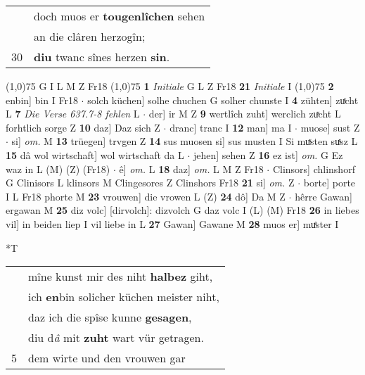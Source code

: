 \documentclass[8pt,a4paper,notitlepage]{article}
\begin{document}
\begin{table}[ht]
\begin{minipage}[t]{0.5\linewidth}
\begin{tabular}{rl}
 & doch muos er \textbf{tougenlîchen} sehen\\ 
 & an die clâren herzogîn;\\ 
30 & \textbf{diu} twanc sînes herzen \textbf{sin}.\\ 
\end{tabular}
\scriptsize
\line(1,0){75} \newline
G I L M Z Fr18 \newline
\line(1,0){75} \newline
\textbf{1} \textit{Initiale} G L Z Fr18  \textbf{21} \textit{Initiale} I  \newline
\line(1,0){75} \newline
\textbf{2} enbin] bin I Fr18  $\cdot$ solch küchen] solhe chuchen G solher chunste I \textbf{4} zühten] zuͯcht L \textbf{7} \textit{Die Verse 637.7-8 fehlen} L   $\cdot$ der] ir M Z \textbf{9} wertlîch zuht] werclich zuͯcht L forhtlich sorge Z \textbf{10} daz] Daz sich Z  $\cdot$ dranc] tranc I \textbf{12} man] ma I  $\cdot$ muose] sust Z  $\cdot$ si] \textit{om.} M \textbf{13} trüegen] trvgen Z \textbf{14} sus muosen si] sus musten I Si muͯsten suͯsz L \textbf{15} dâ wol wirtschaft] wol wirtschaft da L  $\cdot$ jehen] sehen Z \textbf{16} ez ist] \textit{om.} G Ez waz in L (M) (Z) (Fr18)  $\cdot$ ê] \textit{om.} L \textbf{18} daz] \textit{om.} L M Z Fr18  $\cdot$ Clinsors] chlinshorf G Clinisors L klinsors M Clingesores Z Clinshors Fr18 \textbf{21} si] \textit{om.} Z  $\cdot$ borte] porte I L Fr18 phorte M \textbf{23} vrouwen] die vrowen L (Z) \textbf{24} dô] Da M Z  $\cdot$ hêrre Gawan] ergawan M \textbf{25} diz volc] [dirvolch]: dizvolch G daz volc I (L) (M) Fr18 \textbf{26} in liebes vil] in beiden liep I vil liebe in L \textbf{27} Gawan] Gawane M \textbf{28} muos er] muͤster I \newline
\end{minipage}
\hspace{0.5cm}
\begin{minipage}[t]{0.5\linewidth}
\small
\begin{center}*T
\end{center}
\begin{tabular}{rl}
 & mîne kunst mir des niht \textbf{halbez} giht,\\ 
 & ich \textbf{en}bin solicher küchen meister niht,\\ 
 & daz ich die spîse kunne \textbf{gesagen},\\ 
 & diu d\textit{â} mit \textbf{zuht} wart vür getragen.\\ 
5 & dem wirte und den vrouwen gar\\ 

\end{tabular}
\end{minipage}
\end{table}
\end{document}
